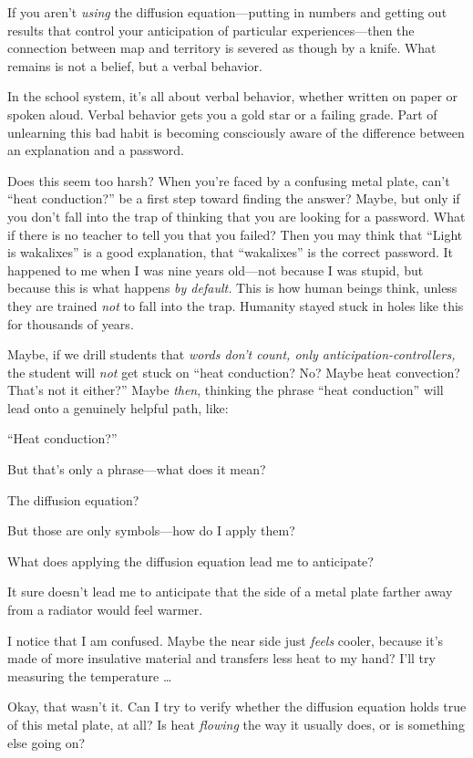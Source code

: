 {
 If you aren't \textit{using} the diffusion
equation---putting in numbers and getting out results that control your
anticipation of particular experiences---then the connection between
map and territory is severed as though by a knife. What remains is not
a belief, but a verbal behavior.}

{
 In the school system, it's all about verbal
behavior, whether written on paper or spoken aloud. Verbal behavior
gets you a gold star or a failing grade. Part of unlearning this bad
habit is becoming consciously aware of the difference between an
explanation and a password.}

{
 Does this seem too harsh? When you're faced by a
confusing metal plate, can't ``heat
conduction?'' be a first step toward finding the
answer? Maybe, but only if you don't fall into the trap
of thinking that you are looking for a password. What if there is no
teacher to tell you that you failed? Then you may think that
``Light is wakalixes'' is a good
explanation, that ``wakalixes'' is
the correct password. It happened to me when I was nine years old---not
because I was stupid, but because this is what happens \textit{by
default.} This is how human beings think, unless they are trained
\textit{not} to fall into the trap. Humanity stayed stuck in holes like
this for thousands of years.}

{
 Maybe, if we drill students that \textit{words
don't count, only anticipation-controllers,} the
student will \textit{not} get stuck on ``heat
conduction? No? Maybe heat convection? That's not it
either?'' Maybe \textit{then}, thinking the phrase
``heat conduction'' will lead onto a
genuinely helpful path, like:}

{
 ``Heat conduction?''}

{
 But that's only a phrase---what does it mean?}

{
 The diffusion equation?}

{
 But those are only symbols---how do I apply them?}

{
 What does applying the diffusion equation lead me to anticipate?}

{
 It sure doesn't lead me to anticipate that the
side of a metal plate farther away from a radiator would feel warmer.}

{
 I notice that I am confused. Maybe the near side just
\textit{feels} cooler, because it's made of more
insulative material and transfers less heat to my hand?
I'll try measuring the temperature \ldots}

{
 Okay, that wasn't it. Can I try to verify whether
the diffusion equation holds true of this metal plate, at all? Is heat
\textit{flowing} the way it usually does, or is something else going
on?}

